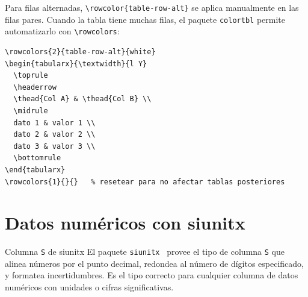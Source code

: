 Para filas alternadas, \texttt{\textbackslash rowcolor\{table-row-alt\}} se
aplica manualmente en las filas pares. Cuando la tabla tiene muchas filas,
el paquete \texttt{colortbl} permite automatizarlo con
\texttt{\textbackslash rowcolors}:

\begin{lstlisting}[style=latex, frame=none, numbers=none]
% Alternar colores desde la fila 2 (la primera es el encabezado)
\rowcolors{2}{table-row-alt}{white}
\begin{tabularx}{\textwidth}{l Y}
  \toprule
  \headerrow
  \thead{Col A} & \thead{Col B} \\
  \midrule
  dato 1 & valor 1 \\
  dato 2 & valor 2 \\
  dato 3 & valor 3 \\
  \bottomrule
\end{tabularx}
\rowcolors{1}{}{}   % resetear para no afectar tablas posteriores
\end{lstlisting}

\section{Datos numéricos con siunitx}
\label{sec:tabla-siunitx}

\begin{definicion}{Columna \texttt{S} de siunitx}
\label{def:columna-s}
El paquete \texttt{siunitx}~\cite{siunitx2023} provee el tipo de columna
\texttt{S} que alinea números por el punto decimal, redondea al número de
dígitos especificado, y formatea incertidumbres. Es el tipo correcto para
cualquier columna de datos numéricos con unidades o cifras significativas.
\end{definicion}

